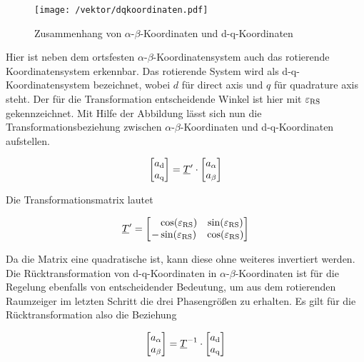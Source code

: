 \begin{figure}[h]
	\centering
	\texttt{[image: /vektor/dqkoordinaten.pdf]}
	\label{fig:dqkoordinaten}
	\caption{Zusammenhang von $\alpha$-$\beta$-Koordinaten und d-q-Koordinaten}
\end{figure}

Hier ist neben dem ortsfesten $\alpha$-$\beta$-Koordinatensystem auch das rotierende Koordinatensystem erkennbar. 
Das rotierende System wird als d-q-Koordinatensystem bezeichnet, wobei $d$ für direct axis und $q$ für quadrature axis steht.
Der für die Transformation entscheidende Winkel ist hier mit $\varepsilon_{\mathrm{RS}}$ gekennzeichnet.
Mit Hilfe der Abbildung lässt sich nun die Transformationsbeziehung zwischen $\alpha$-$\beta$-Koordinaten und d-q-Koordinaten aufstellen.

\begin{align}
	\begin{bmatrix}
		a_{\mathrm{d}} \\
		a_{\mathrm{q}} 
	\end{bmatrix}
	=\underline{T}{^\prime}\cdot 
	\begin{bmatrix}
		a_{\alpha} \\
		a_{\beta}
	\end{bmatrix}
	\label{parkvektor}
\end{align}

Die Transformationsmatrix lautet

\begin{align}
	\underline{T}{^\prime} =
	\begin{bmatrix}
		~~~\cos({\varepsilon_{\mathrm{RS}}}) & \sin({\varepsilon_{\mathrm{RS}}}) \\
		-\sin({\varepsilon_{\mathrm{RS}}}) & \cos({\varepsilon_{\mathrm{RS}}})
	\end{bmatrix}
	\label{parkmatrix}
\end{align}

Da die Matrix eine quadratische ist, kann diese ohne weiteres invertiert werden.
Die Rücktransformation von d-q-Koordinaten in $\alpha$-$\beta$-Koordinaten ist für die Regelung ebenfalls von entscheidender Bedeutung, um aus dem rotierenden Raumzeiger im letzten Schritt die drei Phasengrößen zu erhalten. 
Es gilt für die Rücktransformation also die Beziehung

\begin{align}
	\begin{bmatrix}
		a_{\alpha} \\
		a_{\beta}
	\end{bmatrix}
	=\underline{T}^{-1}\cdot 
	\begin{bmatrix}
		a_{\mathrm{d}} \\
		a_{\mathrm{q}} 
	\end{bmatrix}
	\label{parkvektorinvers}
\end{align}

